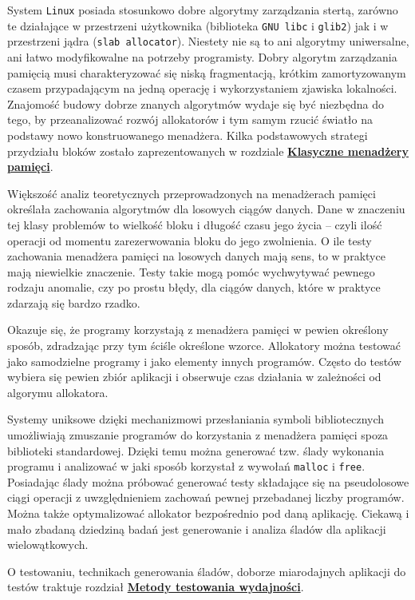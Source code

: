 \documentclass[12pt,a4paper,titlepage,twoside]{mwart}
\begin{document}
System \texttt{Linux} posiada stosunkowo dobre algorytmy zarządzania stertą,
zarówno te działające w przestrzeni użytkownika (biblioteka \texttt{GNU libc} i
\texttt{glib2}) jak i w przestrzeni jądra (\texttt{slab allocator}). Niestety
nie są to ani algorytmy uniwersalne, ani łatwo modyfikowalne na potrzeby
programisty. Dobry algorytm zarządzania pamięcią musi charakteryzować się niską
fragmentacją, krótkim zamortyzowanym czasem przypadającym na jedną operację i
wykorzystaniem zjawiska lokalności. Znajomość budowy dobrze znanych algorytmów
wydaje się być niezbędna do tego, by przeanalizować rozwój allokatorów i tym
samym rzucić światło na podstawy nowo konstruowanego menadżera. Kilka
podstawowych strategi przydziału bloków zostało zaprezentowanych w rozdziale
\hyperlink{Klasyka}{\textbf{Klasyczne menadżery pamięci}}.

Większość analiz teoretycznych przeprowadzonych na menadżerach pamięci
określała zachowania algorytmów dla losowych ciągów danych. Dane w znaczeniu
tej klasy problemów to wielkość bloku i długość czasu jego życia -- czyli ilość
operacji od momentu zarezerwowania bloku do jego zwolnienia. O ile testy
zachowania menadżera pamięci na losowych danych mają sens, to w praktyce mają
niewielkie znaczenie. Testy takie mogą pomóc wychwytywać pewnego rodzaju
anomalie, czy po prostu błędy, dla ciągów danych, które w praktyce zdarzają się
bardzo rzadko.

Okazuje się, że programy korzystają z menadżera pamięci w pewien określony
sposób, zdradzając przy tym ściśle określone wzorce. Allokatory można testować
jako samodzielne programy i jako elementy innych programów. Często do testów
wybiera się pewien zbiór aplikacji i obserwuje czas działania w zależności od
algorymu allokatora.

Systemy uniksowe dzięki mechanizmowi przesłaniania symboli bibliotecznych
umożliwiają zmuszanie programów do korzystania z menadżera pamięci spoza
biblioteki standardowej. Dzięki temu można generować tzw. ślady wykonania
programu i analizować w jaki sposób korzystał z wywołań \texttt{malloc} i
\texttt{free}. Posiadając ślady można próbować generować testy składające się
na pseudolosowe ciągi operacji z uwzględnieniem zachowań pewnej przebadanej
liczby programów. Można także optymalizować allokator bezpośrednio pod daną
aplikację. Ciekawą i mało zbadaną dziedziną badań jest generowanie i analiza
śladów dla aplikacji wielowątkowych.

O testowaniu, technikach generowania śladów, doborze miarodajnych aplikacji do
testów traktuje rozdział \hyperlink{Testowanie}{\textbf{Metody testowania
wydajności}}.
\end{document}
